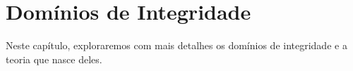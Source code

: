 \chapter{Domínios de Integridade}
Neste capítulo, exploraremos com mais detalhes os domínios de integridade e a teoria que nasce deles.

